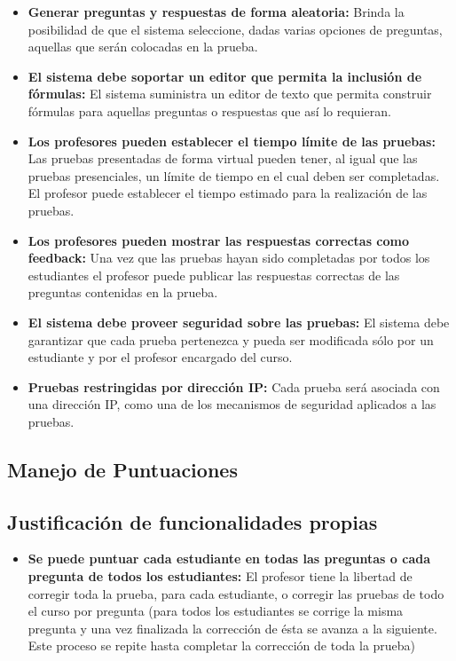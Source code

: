 \begin{itemize}

\item \textbf{Generar preguntas y respuestas de forma aleatoria:} Brinda la posibilidad de que el sistema seleccione, dadas varias opciones de preguntas, aquellas que serán colocadas en la prueba.
\item \textbf{El sistema debe soportar un editor que permita la inclusión de fórmulas:} El sistema suministra un editor de texto que permita construir fórmulas para aquellas preguntas o respuestas que así lo requieran. 
\item \textbf{Los profesores pueden establecer el tiempo límite de las pruebas:} Las pruebas presentadas de forma virtual pueden tener, al igual que las pruebas presenciales, un límite de tiempo en el cual deben ser completadas. El profesor puede establecer el tiempo estimado para la realización de las pruebas.
\item \textbf{Los profesores pueden mostrar las respuestas correctas como feedback:} Una vez que las pruebas hayan sido completadas por todos los estudiantes el profesor puede publicar las respuestas correctas de las preguntas contenidas en la prueba.
\item \textbf{El sistema debe proveer seguridad sobre las pruebas:} El sistema debe garantizar que cada prueba pertenezca y pueda ser modificada sólo por un estudiante y por el profesor encargado del curso.
\item \textbf{Pruebas restringidas por dirección IP:} Cada prueba será asociada con una dirección IP, como una de los mecanismos de seguridad aplicados a las pruebas.

\end{itemize}

\subsection{Manejo de Puntuaciones}

\subsection*{Justificación de funcionalidades propias}

\begin{itemize}

\item \textbf{Se puede puntuar cada estudiante en todas las preguntas o cada pregunta de todos los estudiantes:} El profesor tiene la libertad de corregir toda la prueba, para cada estudiante, o corregir las pruebas de todo el curso por pregunta (para todos los estudiantes se corrige la misma pregunta y una vez finalizada la corrección de ésta se avanza a la siguiente. Este proceso se repite hasta completar la corrección de toda la prueba)

\end{itemize}

